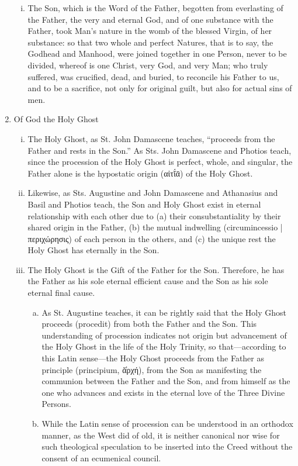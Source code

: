 \begin{enumerate}
\begin{enumerate}[i.]
		\item The Son, which is the Word of the Father, begotten from everlasting of the Father, the very and eternal God, and of one substance with the Father, took Man's nature in the womb of the blessed Virgin, of her substance: so that two whole and perfect Natures, that is to say, the Godhead and Manhood, were joined together in one Person, never to be divided, whereof is one Christ, very God, and very Man; who truly suffered, was crucified, dead, and buried, to reconcile his Father to us, and to be a sacrifice, not only for original guilt, but also for actual sins of men.
	\end{enumerate}
	\item Of God the Holy Ghost
	\begin{enumerate}[i.]
		\item The Holy Ghost, as St. John Damascene teaches, ``proceeds from the Father and rests in the Son.'' As Sts. John Damascene and Photios teach, since the procession of the Holy Ghost is perfect, whole, and singular, the Father alone is the hypostatic origin (αἰτῐ́ᾱ) of the Holy Ghost.
		\item Likewise, as Sts. Augustine and John Damascene and Athanasius and Basil and Photios teach, the Son and Holy Ghost exist in eternal relationship with each other due to (a) their consubstantiality by their shared origin in the Father, (b) the mutual indwelling (circumincessio | περιχώρησις) of each person in the others, and (c) the unique rest the Holy Ghost has eternally in the Son.
		\item The Holy Ghost is the Gift of the Father for the Son. Therefore, he has the Father as his sole eternal efficient cause and the Son as his sole eternal final cause.
			\begin{enumerate}[a.]
				\item As St. Augustine teaches, it can be rightly said that the Holy Ghost proceeds (procedit) from both the Father and the Son. This understanding of procession indicates not origin but advancement of the Holy Ghost in the life of the Holy Trinity, so that---according to this Latin sense---the Holy Ghost proceeds from the Father as principle (principium, ᾰ̓ρχή), from the Son as manifesting the communion between the Father and the Son, and from himself as the one who advances and exists in the eternal love of the Three Divine Persons.
				\item While the Latin sense of procession can be understood in an orthodox manner, as the West did of old, it is neither canonical nor wise for such theological speculation to be inserted into the Creed without the consent of an ecumenical council.

\end{enumerate}
\end{enumerate}
\end{enumerate}
